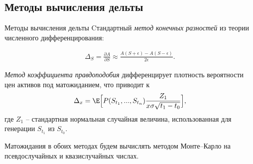 \documentclass[aspectratio=169]{beamer}
\begin{document}
    \subsection{Методы вычисления дельты}
    \begin{frame}{Методы вычисления дельты}
        Cтандартный \textit{метод конечных разностей} из теории численного дифференцирования:
    
    \begin{align*}
        \Delta_S = \frac{\partial A}{\partial S} \approx \frac{A(S+\epsilon)-A(S-\epsilon)}{2\epsilon}.
    \end{align*}

        \textit{Метод коэффициента правдоподобия} дифференцирует плотность вероятности цен активов под матожиданием, что приводит к 
    \begin{align*}
        \Delta_x =  \E\Big[P(S_{t_1}, ..., S_{t_n}) \frac{Z_1}{x\sigma\sqrt{t_1-t_0}}\Big],
    \end{align*}
    где $Z_1$ -- стандартная нормальная случайная величина, использованная для генерации $S_{t_1}$ из $S_{t_0}$.     
    
    Матожидания в обоих методах будем вычислять методом Монте--Карло на псевдослучайных и квазислучайных числах.
    \end{frame}





































    
    
\end{document}
